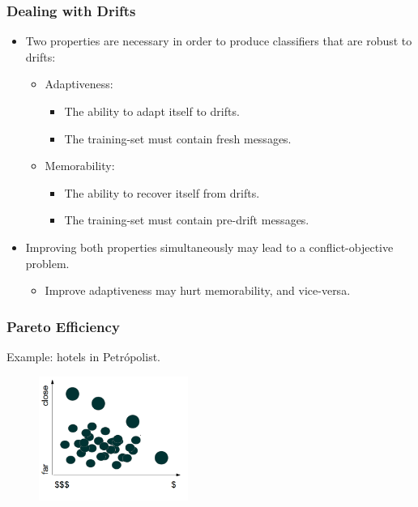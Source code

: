 \documentclass[14pt]{beamer}
\begin{document}
\begin{frame}\frametitle{Dealing with Drifts}

\begin{itemize}
\item Two properties are necessary in order to produce classifiers that are robust to drifts:
\begin{itemize}
\item Adaptiveness:
\begin{itemize}
\item The ability to adapt itself to drifts.
\item The training-set must contain fresh messages.
\end{itemize}
\item Memorability:
\begin{itemize}
\item The ability to recover itself from drifts.
\item The training-set must contain pre-drift messages.
\end{itemize}
\end{itemize}
\item Improving both properties simultaneously may lead to a conflict-objective problem.
\begin{itemize}
\item Improve adaptiveness may hurt memorability, and vice-versa.
\end{itemize}
\end{itemize}

\end{frame}


\begin{frame}\frametitle{Pareto Efficiency}

Example: hotels in Petr\'{o}polist.

\begin{figure}
\centering
\includegraphics[height=1.60in]{hotel1}
\end{figure}

\end{frame}
\end{document}
